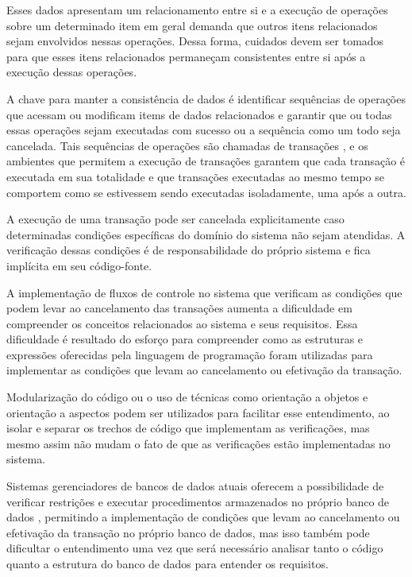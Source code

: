 \documentclass[11pt,twoside,a4paper]{book}
\begin{document}
Esses dados apresentam um relacionamento entre si e a execução de operações sobre um determinado item em geral demanda que outros itens relacionados sejam envolvidos nessas operações. Dessa forma, cuidados devem ser tomados para que esses itens relacionados permaneçam consistentes entre si após a execução dessas operações.

A chave para manter a consistência de dados é identificar sequências de operações que acessam ou modificam items de dados relacionados e garantir que ou todas essas operações sejam executadas com sucesso ou a sequência como um todo seja cancelada. Tais sequências de operações são chamadas de transações \cite{gray},  e os ambientes que permitem a execução de transações garantem que cada transação é executada em sua totalidade e que transações executadas ao mesmo tempo se comportem como se estivessem sendo executadas isoladamente, uma após a outra.

A execução de uma transação pode ser cancelada explicitamente caso determinadas condições específicas do domínio do sistema não sejam atendidas. A verificação dessas condições é de responsabilidade do próprio sistema e fica implícita em seu código-fonte.

A implementação de fluxos de controle no sistema que verificam as condições que podem levar ao cancelamento das transações aumenta a dificuldade em compreender os conceitos relacionados ao sistema e seus requisitos. Essa dificuldade é resultado do esforço para compreender como as estruturas e expressões oferecidas pela linguagem de programação foram utilizadas para implementar as condições que levam ao cancelamento ou efetivação da transação.

Modularização do código ou o uso de técnicas como orientação a objetos \cite{oop} e orientação a aspectos \cite{aop} podem ser utilizados para facilitar esse entendimento, ao isolar e separar os trechos de código que implementam as verificações, mas mesmo assim não mudam o fato de que as verificações estão implementadas no sistema.

Sistemas gerenciadores de bancos de dados atuais oferecem a possibilidade de verificar restrições e executar procedimentos armazenados no próprio banco de dados \cite{vaca}, permitindo a implementação de condições que levam ao cancelamento ou efetivação da transação no próprio banco de dados, mas isso também pode dificultar o entendimento uma vez que será necessário analisar tanto o código quanto a estrutura do banco de dados para entender os requisitos. 
\end{document}
